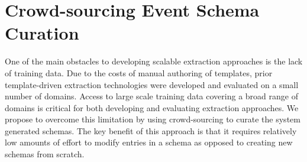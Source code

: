 \section{\label{sec:data-collection}Crowd-sourcing Event Schema Curation}
One of the main obstacles to developing scalable extraction approaches is the lack of training data. Due to the costs of manual authoring of templates, prior template-driven extraction technologies were developed and evaluated on a small number of domains. Access to large scale training data covering a broad range of domains is critical for both developing and evaluating extraction approaches. We propose to overcome this limitation by using crowd-sourcing to curate the system generated schemas. The key benefit of this approach is that it requires relatively low amounts of effort to modify entries in a schema as opposed to creating new schemas from scratch. 

